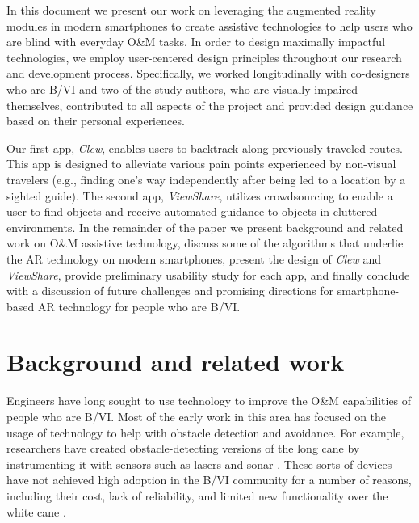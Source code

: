 \documentclass[chi_draft]{sigchi}
\newcommand{\BVI}{B/VI\xspace}
\newcommand{\OM}{O\&M\xspace}
\begin{document}
In this document we present our work on leveraging the augmented reality modules in modern smartphones to create assistive technologies to help users who are blind with everyday \OM tasks.  In order to design maximally impactful technologies, we employ user-centered design principles throughout our research and development process.  Specifically, we worked longitudinally with co-designers who are \BVI and two of the study authors, who are visually impaired themselves, contributed to all aspects of the project and provided design guidance based on their personal experiences.

Our first app, \emph{Clew}, enables users to backtrack along previously traveled routes.  This app is designed to alleviate various pain points experienced by non-visual travelers (e.g., finding one's way independently after being led to a location by a sighted guide).  The second app, \emph{ViewShare}, utilizes crowdsourcing to enable a user to find objects and receive automated guidance to objects in cluttered environments.  In the remainder of the paper we present background and related work on \OM assistive technology, discuss some of the algorithms that underlie the AR technology on modern smartphones, present the design of \emph{Clew} and \emph{ViewShare}, provide preliminary usability study for each app, and finally conclude with a discussion of future challenges and promising directions for smartphone-based AR technology for people who are \BVI.   

\section{Background and related work}
Engineers have long sought to use technology to improve the \OM capabilities of people who are \BVI.  Most of the early work in this area has focused on the usage of technology to help with obstacle detection and avoidance.  For example, researchers have created obstacle-detecting versions of the long cane by instrumenting it with sensors such as lasers \cite{benjamin1973new} and sonar \cite{borenstein1997guidecane}.  These sorts of devices have not achieved high adoption in the \BVI community for a number of reasons, including their cost, lack of reliability, and limited new functionality over the white cane \cite{wiener2010foundations}.
\end{document}
